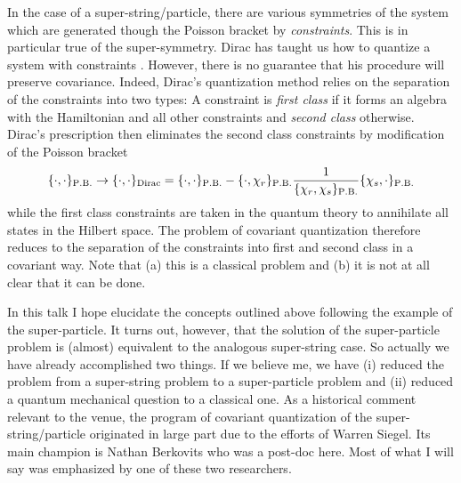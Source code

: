 \documentclass[12pt]{article}
\begin{document}
In the case of a super-string/particle, there are various symmetries of the system which are generated though the Poisson bracket by {\em constraints}. This is in particular true of the super-symmetry. Dirac has taught us how to quantize a system with constraints \cite{Dirac}. However, there is no guarantee that his procedure will preserve covariance. Indeed, Dirac's quantization method relies on the separation of the constraints into two types: A constraint is {\em first class} if it forms an algebra with the Hamiltonian and all other constraints and {\em second class} otherwise. Dirac's prescription then eliminates the second class constraints by modification of the Poisson bracket
\begin{eqnarray}
\{\cdot, \cdot\}_\mathrm{P.B.} \to 
\{\cdot, \cdot\}_\mathrm{Dirac}=
\{\cdot, \cdot\}_\mathrm{P.B.}-\{\cdot, \chi_r\}_\mathrm{P.B.}
{1\over \{\chi_r, \chi_s\}_\mathrm{P.B.}}
\{\chi_s,\cdot\}_\mathrm{P.B.}
\end{eqnarray}
while the first class constraints are taken in the quantum theory to annihilate all states in the Hilbert space. The problem of covariant quantization therefore reduces to the separation of the constraints into first and second class in a covariant way. Note that (a) this is a classical problem and (b) it is not at all clear that it can be done.

In this talk I hope elucidate the concepts outlined above following the example of the super-particle. It turns out, however, that the solution of the super-particle problem is (almost) equivalent to the analogous super-string case. So actually we have already accomplished two things. If we believe me, we have (i) reduced the problem from a super-string problem to a super-particle problem and (ii) reduced a quantum mechanical question to a classical one. As a historical comment relevant to the venue, the program of  covariant quantization of the super-string/particle originated in large part due to the efforts of Warren Siegel. Its main champion is Nathan Berkovits who was a post-doc here. Most of what I will say was emphasized by one of these two researchers. 
\end{document}
